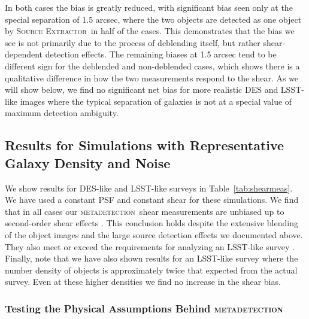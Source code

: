 \documentclass[fleqn,useAMS,usenatbib]{mnras}
\newcommand{\mdet}{\textsc{metadetection}}
\newcommand{\sx}{\textsc{Source Extractor}}
\begin{document}
In both cases the bias is greatly reduced, with significant bias seen only at
the special separation of 1.5 arcsec, where the two objects are detected as one
object by \sx\ in half of the cases. This demonstrates that the bias we see is
not primarily due to the process of deblending itself, but rather
shear-dependent detection effects. The remaining biases at 1.5 arcsec tend to
be different sign for the deblended and non-deblended cases, which shows there
is a qualitative difference in how the two measurements respond to the shear.
As we will show below, we find no significant net bias for more realistic DES
and LSST-like images where the typical separation of galaxies is not at a
special value of maximum detection ambiguity.

\subsection{Results for Simulations with Representative Galaxy Density and Noise}
\label{sec:res:constpsf}

We show results for DES-like and LSST-like surveys in Table~\ref{tab:shearmeas}.
We have used a constant PSF and constant shear for these simulations. We find
that in all cases our \mdet\ shear measurements are unbiased up to
second-order shear effects \citep[we expect a bias of a few parts in 10000 for shears
of 0.02, see][]{SheldonMcal2017}. This conclusion holds despite the extensive blending
of the object images and the large source detection effects we documented
above. They also meet or exceed the requirements for analyzing an LSST-like survey
\citep[e.g.,][]{huterer2006}. Finally, note that we have also shown results for an
LSST-like survey where the number density of objects is approximately twice that
expected from the actual survey.  Even at these higher densities we find
no increase in the shear bias.

\subsubsection{Testing the Physical Assumptions Behind \mdet}
\label{sec:mdetphys}
\end{document}
